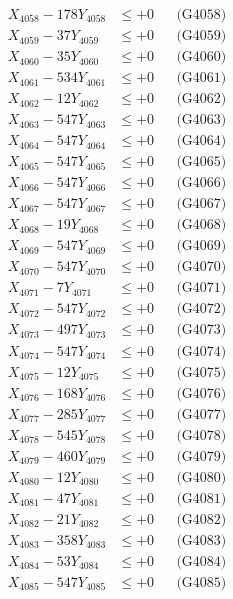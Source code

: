 \documentclass[a4paper,10pt]{article}
\begin{document}
{\begin{align}
X_{4058} - 178Y_{4058} &\leq +0 && \text{(G4058)} \\
X_{4059} - 37Y_{4059} &\leq +0 && \text{(G4059)} \\
X_{4060} - 35Y_{4060} &\leq +0 && \text{(G4060)} \\
\allowbreak
X_{4061} - 534Y_{4061} &\leq +0 && \text{(G4061)} \\
X_{4062} - 12Y_{4062} &\leq +0 && \text{(G4062)} \\
X_{4063} - 547Y_{4063} &\leq +0 && \text{(G4063)} \\
X_{4064} - 547Y_{4064} &\leq +0 && \text{(G4064)} \\
X_{4065} - 547Y_{4065} &\leq +0 && \text{(G4065)} \\
X_{4066} - 547Y_{4066} &\leq +0 && \text{(G4066)} \\
X_{4067} - 547Y_{4067} &\leq +0 && \text{(G4067)} \\
X_{4068} - 19Y_{4068} &\leq +0 && \text{(G4068)} \\
X_{4069} - 547Y_{4069} &\leq +0 && \text{(G4069)} \\
X_{4070} - 547Y_{4070} &\leq +0 && \text{(G4070)} \\
\allowbreak
X_{4071} - 7Y_{4071} &\leq +0 && \text{(G4071)} \\
X_{4072} - 547Y_{4072} &\leq +0 && \text{(G4072)} \\
X_{4073} - 497Y_{4073} &\leq +0 && \text{(G4073)} \\
X_{4074} - 547Y_{4074} &\leq +0 && \text{(G4074)} \\
X_{4075} - 12Y_{4075} &\leq +0 && \text{(G4075)} \\
X_{4076} - 168Y_{4076} &\leq +0 && \text{(G4076)} \\
X_{4077} - 285Y_{4077} &\leq +0 && \text{(G4077)} \\
X_{4078} - 545Y_{4078} &\leq +0 && \text{(G4078)} \\
X_{4079} - 460Y_{4079} &\leq +0 && \text{(G4079)} \\
X_{4080} - 12Y_{4080} &\leq +0 && \text{(G4080)} \\
\allowbreak
X_{4081} - 47Y_{4081} &\leq +0 && \text{(G4081)} \\
X_{4082} - 21Y_{4082} &\leq +0 && \text{(G4082)} \\
X_{4083} - 358Y_{4083} &\leq +0 && \text{(G4083)} \\
X_{4084} - 53Y_{4084} &\leq +0 && \text{(G4084)} \\
X_{4085} - 547Y_{4085} &\leq +0 && \text{(G4085)} \\

\end{align}}
\end{document}
